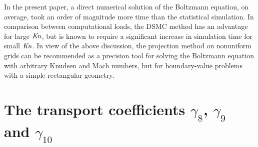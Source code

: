 \documentclass[]{jfm}
\newcommand{\Kn}{\mbox{\textit{Kn}}}
\begin{document}
In the present paper, a direct numerical solution of the Boltzmann equation, on average,
took an order of magnitude more time than the statistical simulation.
In comparison between computational loads, the DSMC method has an advantage for large \(\Kn\),
but is known to require a significant increase in simulation time for small \(\Kn\).
In view of the above discussion, the projection method on nonuniform grids can be recommended
as a precision tool for solving the Boltzmann equation with arbitrary Knudsen and Mach numbers,
but for boundary-value problems with a simple rectangular geometry.

\appendix
\section{The transport coefficients \(\gamma_8\), \(\gamma_9\) and \(\gamma_{10}\)}
\label{sec:gamma_coeffs}
\end{document}
